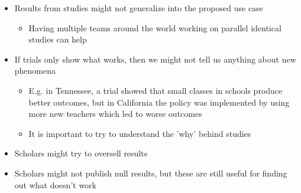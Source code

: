 \documentclass[11pt]{article}
\begin{document}
\begin{itemize}
\begin{itemize}
\item Results from studies might not generalize into the proposed use case
\begin{itemize}
\item Having multiple teams around the world working on parallel identical
studies can help
\end{itemize}
\item If trials only show what works, then we might not tell us anything about
new phenomena
\begin{itemize}
\item E.g. in Tennessee, a trial showed that small classes in schools produce
better outcomes, but in California the policy was implemented by using
more new teachers which led to worse outcomes
\item It is important to try to understand the 'why' behind studies
\end{itemize}
\item Scholars might try to oversell results
\item Scholars might not publish null results, but these are still useful for
finding out what doesn't work
\end{itemize}
\end{itemize}
\end{document}
